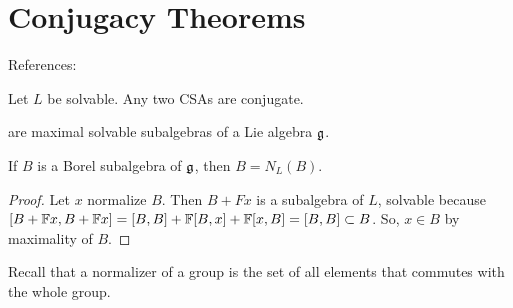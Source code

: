 \chapter{Conjugacy Theorems}
\label{cha:conjugacy_theorems}

References: \cite[$\S 16$]{humphreys1972introduction}

\begin{theorem}
    Let $L$ be solvable. Any two CSAs are conjugate.
\end{theorem}

 are maximal solvable subalgebras of a Lie algebra $\mathfrak{g}$.
\begin{lemma}
    If $B$  is a Borel subalgebra of $\mathfrak{g}$, then $B=N_L(B)$.
\end{lemma}
\begin{proof}
    Let $x$ normalize $B$. Then $B + Fx$ is a subalgebra of $L$, solvable because $[B + \mathbb{F} x, B + \mathbb{F} x] = [B,B] + \mathbb{F} [B,x] + \mathbb{F} [x,B] = [B,B] \subset B$. So, $x\in B$ by maximality of $B$.
\end{proof}
\begin{insight}
    Recall that a normalizer of a group is the set of all elements that commutes with the whole group.
\end{insight}



